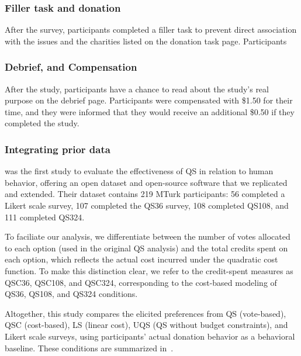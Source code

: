 \subsubsection{Filler task and donation}
After the survey, participants completed a filler task to prevent direct association with the issues and the charities listed on the donation task page. Participants 

\subsubsection{Debrief, and Compensation}
After the study, participants have a chance to read about the study's real purpose on the debrief page. Participants were compensated with \$1.50 for their time, and they were informed that they would receive an additional \$0.50 if they completed the study.

\subsubsection{Integrating prior data}
\citet{chengCanShowWhat2021} was the first study to evaluate the effectiveness of QS in relation to human behavior, offering an open dataset and open-source software that we replicated and extended. Their dataset contains 219 MTurk participants: 56 completed a Likert scale survey, 107 completed the QS36 survey, 108 completed QS108, and 111 completed QS324.

To faciliate our analysis, we differentiate between the number of votes allocated to each option (used in the original QS analysis) and the total credits spent on each option, which reflects the actual cost incurred under the quadratic cost function. To make this distinction clear, we refer to the credit-spent measures as QSC36, QSC108, and QSC324, corresponding to the cost-based modeling of QS36, QS108, and QS324 conditions.

Altogether, this study compares the elicited preferences from QS (vote-based), QSC (cost-based), LS (linear cost), UQS (QS without budget constraints), and Likert scale surveys, using participants' actual donation behavior as a behavioral baseline. These conditions are summarized in~.


